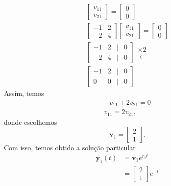 \begin{ex}
\begin{gather}
\begin{bmatrix}
      v_{11} \\
      v_{21}
    \end{bmatrix} =
    \begin{bmatrix}
      0 \\
      0
    \end{bmatrix} \\
        \begin{bmatrix}
      -1 & 2 \\
      -2 & 4
    \end{bmatrix}
    \begin{bmatrix}
      v_{11} \\
      v_{21}
    \end{bmatrix} =
    \begin{bmatrix}
      0 \\
      0
    \end{bmatrix} \\
    \begin{bmatrix}
      -1 & 2 & | & 0 \\
      -2 & 4 & | & 0
    \end{bmatrix}
    \begin{matrix}
      \times 2 \\
      \leftarrow -
    \end{matrix} \\
    \begin{bmatrix}
      -1 & 2 & | & 0 \\
      0 & 0 & | & 0
    \end{bmatrix}    
  \end{gather}
Assim, temos
\begin{gather}
  -v_{11} + 2v_{21} = 0 \\
  v_{11} = 2v_{21},
\end{gather}
donde escolhemos
\begin{equation}
\pmb{v}_1 =
\begin{bmatrix}
  2 \\
  1
\end{bmatrix}.
\end{equation}
Com isso, temos obtido a solução particular
\begin{align}
  \pmb{y}_1(t) &= \pmb{v}_1e^{r_1t} \\
               &=
                 \begin{bmatrix}
                   2\\
                   1
                 \end{bmatrix}e^{-t}
\end{align}



\end{ex}
